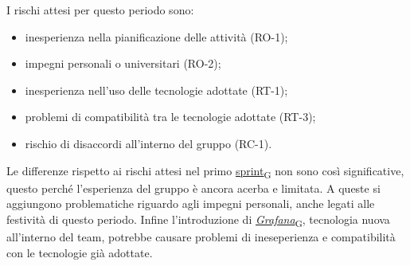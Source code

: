 I rischi attesi per questo periodo sono:
\begin{itemize}
	\item inesperienza nella pianificazione delle attività (RO-1);
	\item impegni personali o universitari (RO-2);
	\item inesperienza nell'uso delle tecnologie adottate (RT-1);
	\item problemi di compatibilità tra le tecnologie adottate (RT-3);
	\item rischio di disaccordi all'interno del gruppo (RC-1).
\end{itemize}
Le differenze rispetto ai rischi attesi nel primo \href{https://7last.github.io/docs/pb/documentazione-interna/glossario\#sprint}{sprint\textsubscript{G}} non sono così significative, questo perché l'esperienza del gruppo è ancora acerba e limitata.
A queste si aggiungono problematiche riguardo agli impegni personali, anche legati alle festività di questo periodo. Infine l'introduzione di \href{https://7last.github.io/docs/pb/documentazione-interna/glossario\#grafana}{\textit{Grafana}\textsubscript{G}},
tecnologia nuova all'interno del team, potrebbe causare problemi di ineseperienza e compatibilità con le tecnologie già adottate.

